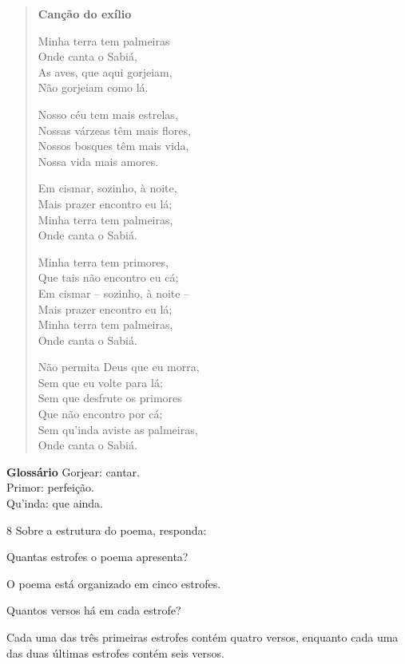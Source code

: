 \begin{quote}
\textbf{Canção do exílio}

Minha terra tem palmeiras\\
Onde canta o Sabiá,\\
As aves, que aqui gorjeiam,\\
Não gorjeiam como lá.

Nosso céu tem mais estrelas,\\
Nossas várzeas têm mais flores,\\
Nossos bosques têm mais vida,\\
Nossa vida mais amores.

Em cismar, sozinho, à noite,\\
Mais prazer encontro eu lá;\\
Minha terra tem palmeiras,\\
Onde canta o Sabiá.

Minha terra tem primores,\\
Que tais não encontro eu cá;\\
Em cismar -- sozinho, à noite --\\
Mais prazer encontro eu lá;\\
Minha terra tem palmeiras,\\
Onde canta o Sabiá.

Não permita Deus que eu morra,\\
Sem que eu volte para lá;\\
Sem que desfrute os primores\\
Que não encontro por cá;\\
Sem qu'inda aviste as palmeiras,\\
Onde canta o Sabiá.

\end{quote}

\textbf{Glossário}
Gorjear: cantar.\\
Primor: perfeição.\\
Qu'inda: que ainda.

\num{8} Sobre a estrutura do poema, responda:

\begin{escolha}
\item Quantas estrofes o poema apresenta?

 O poema está organizado em cinco estrofes.

\item Quantos versos há em cada estrofe?

 Cada uma das três primeiras estrofes contém quatro versos, enquanto cada uma das duas últimas estrofes contém seis versos.
\end{escolha}


